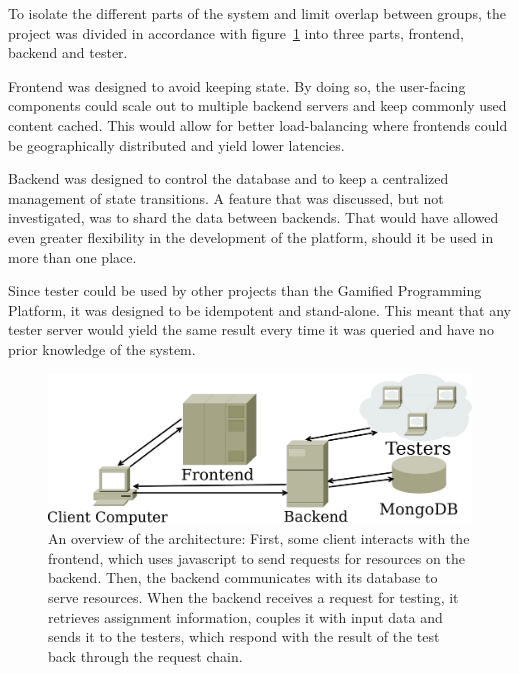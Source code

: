 To isolate the different parts of the system and limit overlap between groups, the project was divided in accordance with figure~\ref{fig:architecture} into three parts, frontend, backend and tester.

Frontend was designed to avoid keeping state. By doing so, the user-facing components could scale out to multiple backend servers and keep commonly used content cached. This would allow for better load-balancing where frontends could be geographically distributed and yield lower latencies.

Backend was designed to control the database and to keep a centralized management of state transitions. A feature that was discussed, but not investigated, was to shard the data between backends. That would have allowed even greater flexibility in the development of the platform, should it be used in more than one place.

Since tester could be used by other projects than the Gamified Programming Platform, it was designed to be idempotent and stand-alone. This meant that any tester server would yield the same result every time it was queried and have no prior knowledge of the system.
\begin{figure}
    \centering
    \includegraphics[width=.9\textwidth]{img/architecture.pdf}
    \caption{An overview of the architecture: First, some client interacts with the frontend, which uses javascript to send requests for resources on the backend. Then, the backend communicates with its database to serve resources. When the backend receives a request for testing, it retrieves assignment information, couples it with input data and sends it to the testers, which respond with the result of the test back through the request chain.}\label{fig:architecture}
\end{figure}
